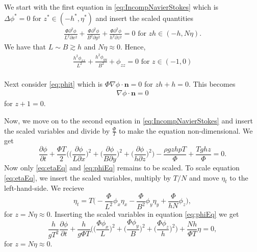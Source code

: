 \documentclass[11pt]{article}
\begin{document}
We start with the first equation in \eqref{eq:IncompNavierStokes} which is $\Delta \phi^* = 0 \text{ for } z^* \in(-h^*, \eta^*)$ and insert the scaled quantities
\begin{align*}
\frac{\Phi\partial^2\phi}{L^2\partial x^{2}} +  \frac{\Phi\partial^2\phi}{B^2\partial y^{2}} + \frac{\Phi\partial^2\phi}{h^2\partial z^{2}} = 0 \text{ for } zh \in(-h, N\eta).
\end{align*}
We have that $L \sim B \gtrsim h$ and $N\eta \approx 0$. Hence,
\begin{equation}\label{2.8a scaled}
\begin{aligned}
\frac{h^2\phi_{xx}}{L^2} + \frac{h^2\phi_{yy}}{B^2} + \phi_{zz} = 0 \text{ for } z \in(-1,0) \\
\end{aligned}
\end{equation}

Next consider \eqref{eq:phit} which is $
\Phi \nabla \phi \cdot \bm{n} = 0 $ for $ zh + h = 0$. This becomes
\begin{align}\label{2.9a scaled}
\nabla \phi \cdot \bm{n} = 0
\end{align}
for $z +1 = 0$.


Now, we move on to the second equation in \eqref{eq:IncompNavierStokes} and insert the scaled variables and divide by $\frac{\Phi}{T}$ to make the equation non-dimensional. We get
\begin{equation*}
\frac{\partial \phi}{\partial t} + \frac{\Phi T}{2}\bigg(\Big(\frac{\partial \phi}{L\partial x}\Big)^2 + \Big(\frac{\partial\phi}{B\partial y}\Big)^2 + \Big(\frac{\partial \phi}{h\partial z}\Big)^2\bigg) - \frac{\rho g z h p T }{\Phi} + \frac{Tghz}{\Phi} = 0.
\end{equation*}
Now only \eqref{eq:etaEq} and \eqref{eq:phiEq} remains to be scaled. %
To scale equation \eqref{eq:etaEq}, we insert the scaled variables, multiply by $T/N$ and move $\eta_t$ to the left-hand-side. We recieve
\begin{equation} \label{etat}
 \eta_t = T \bigg(-\frac{\Phi}{L^2} \phi_x  \eta_x - \frac{\Phi}{B^2} \phi_y \eta_y + \frac{\Phi}{hN} \phi_z \bigg),
\end{equation}
for $z = N\eta \approx 0$.
Inserting the scaled variables in equation \eqref{eq:phiEq} we get
\begin{equation} \label{eq13}
\frac{ h}{g T^2 } \frac{\partial \phi }{\partial t} + \frac{h}{g\Phi T}\bigg(\Big(\frac{\Phi \phi_x}{L}\Big)^2+\Big(\frac{\Phi \phi_y}{B}\Big)^2+\Big(\frac{\Phi \phi_z}{h}\Big)^2\bigg) + \frac{Nh}{\Phi T}\eta = 0,
\end{equation}
for $z = N\eta \approx 0$.
\end{document}
